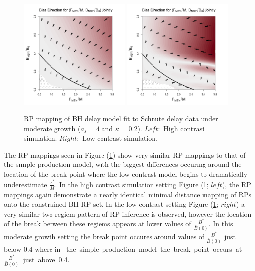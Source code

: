 %
\begin{figure}[h!]
\includegraphics[width=0.48\textwidth]{../ddBias/directionalBiasDDSubExpT45N150A0-1AS4K0.2N38.png} %
\includegraphics[width=0.48\textwidth]{../ddBias/directionalBiasDDSubFlatT45N150A0-1AS4K0.2N56.png} %
\vspace{-0.75cm}
\caption{
RP mapping of BH delay model fit to Schnute delay data under moderate growth ($a_s=4$ and $\kappa=0.2$). 
$Left:$ High contrast simulation.
$Right:$ Low contrast simulation.
}\label{moderateGrowth}
\end{figure}

%
The RP mappings seen in Figure (\ref{moderateGrowth}) show very similar RP mappings 
to that of the simple production model, with the biggest differences occuring 
around the location of the break point where the low contrast model begins to 
dramatically underestimate $\frac{F^*}{M}$.
%
In the high contrast simulation setting Figure (\ref{moderateGrowth}; $left$), 
the RP mappings again demonstrate a nearly identical minimal distance mapping of 
RPs onto the constrained BH RP set. In the low contrast setting Figure (\ref{moderateGrowth}; $right$) 
a very similar two regiem pattern of RP inference is observed, however the 
location of the break between these regiems appears at lower values of 
$\frac{B^*}{\bar B(0)}$. In this moderate growth setting the break point 
occures around values of $\frac{B^*}{\bar B(0)}$ just below 0.4 where in %
\mbox{
the simple production model the break point occurs at $\frac{B^*}{\bar B(0)}$ 
just above 0.4. 
}

